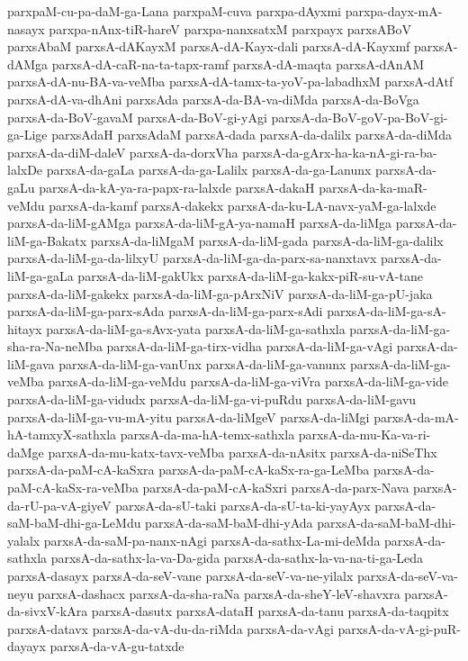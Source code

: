 {parxpaM-cu-pa-daM-ga-Lana
parxpaM-cuva
parxpa-dAyxmi
parxpa-dayx-mA-nasayx
parxpa-nAnx-tiR-hareV
parxpa-nanxsatxM
parxpayx
parxsABoV
parxsAbaM
parxsA-dAKayxM
parxsA-dA-Kayx-dali
parxsA-dA-Kayxmf
parxsA-dAMga
parxsA-dA-caR-na-ta-tapx-ramf
parxsA-dA-maqta
parxsA-dAnAM
parxsA-dA-nu-BA-va-veMba
parxsA-dA-tamx-ta-yoV-pa-labadhxM
parxsA-dAtf
parxsA-dA-va-dhAni
parxsAda
parxsA-da-BA-va-diMda
parxsA-da-BoVga
parxsA-da-BoV-gavaM
parxsA-da-BoV-gi-yAgi
parxsA-da-BoV-goV-pa-BoV-gi-ga-Lige
parxsAdaH
parxsAdaM
parxsA-dada
parxsA-da-dalilx
parxsA-da-diMda
parxsA-da-diM-daleV
parxsA-da-dorxVha
parxsA-da-gArx-ha-ka-nA-gi-ra-ba-lalxDe
parxsA-da-gaLa
parxsA-da-ga-Lalilx
parxsA-da-ga-Lanunx
parxsA-da-gaLu
parxsA-da-kA-ya-ra-papx-ra-lalxde
parxsA-dakaH
parxsA-da-ka-maR-veMdu
parxsA-da-kamf
parxsA-dakekx
parxsA-da-ku-LA-navx-yaM-ga-lalxde
parxsA-da-liM-gAMga
parxsA-da-liM-gA-ya-namaH
parxsA-da-liMga
parxsA-da-liM-ga-Bakatx
parxsA-da-liMgaM
parxsA-da-liM-gada
parxsA-da-liM-ga-dalilx
parxsA-da-liM-ga-da-lilxyU
parxsA-da-liM-ga-da-parx-sa-nanxtavx
parxsA-da-liM-ga-gaLa
parxsA-da-liM-gakUkx
parxsA-da-liM-ga-kakx-piR-su-vA-tane
parxsA-da-liM-gakekx
parxsA-da-liM-ga-pArxNiV
parxsA-da-liM-ga-pU-jaka
parxsA-da-liM-ga-parx-sAda
parxsA-da-liM-ga-parx-sAdi
parxsA-da-liM-ga-sA-hitayx
parxsA-da-liM-ga-sAvx-yata
parxsA-da-liM-ga-sathxla
parxsA-da-liM-ga-sha-ra-Na-neMba
parxsA-da-liM-ga-tirx-vidha
parxsA-da-liM-ga-vAgi
parxsA-da-liM-gava
parxsA-da-liM-ga-vanUnx
parxsA-da-liM-ga-vanunx
parxsA-da-liM-ga-veMba
parxsA-da-liM-ga-veMdu
parxsA-da-liM-ga-viVra
parxsA-da-liM-ga-vide
parxsA-da-liM-ga-vidudx
parxsA-da-liM-ga-vi-puRdu
parxsA-da-liM-gavu
parxsA-da-liM-ga-vu-mA-yitu
parxsA-da-liMgeV
parxsA-da-liMgi
parxsA-da-mA-hA-tamxyX-sathxla
parxsA-da-ma-hA-temx-sathxla
parxsA-da-mu-Ka-va-ri-daMge
parxsA-da-mu-katx-tavx-veMba
parxsA-da-nAsitx
parxsA-da-niSeThx
parxsA-da-paM-cA-kaSxra
parxsA-da-paM-cA-kaSx-ra-ga-LeMba
parxsA-da-paM-cA-kaSx-ra-veMba
parxsA-da-paM-cA-kaSxri
parxsA-da-parx-Nava
parxsA-da-rU-pa-vA-giyeV
parxsA-da-sU-taki
parxsA-da-sU-ta-ki-yayAyx
parxsA-da-saM-baM-dhi-ga-LeMdu
parxsA-da-saM-baM-dhi-yAda
parxsA-da-saM-baM-dhi-yalalx
parxsA-da-saM-pa-nanx-nAgi
parxsA-da-sathx-La-mi-deMda
parxsA-da-sathxla
parxsA-da-sathx-la-va-Da-gida
parxsA-da-sathx-la-va-na-ti-ga-Leda
parxsA-dasayx
parxsA-da-seV-vane
parxsA-da-seV-va-ne-yilalx
parxsA-da-seV-va-neyu
parxsA-dashacx
parxsA-da-sha-raNa
parxsA-da-sheY-leV-shavxra
parxsA-da-sivxV-kAra
parxsA-dasutx
parxsA-dataH
parxsA-da-tanu
parxsA-da-taqpitx
parxsA-datavx
parxsA-da-vA-du-da-riMda
parxsA-da-vAgi
parxsA-da-vA-gi-puR-dayayx
parxsA-da-vA-gu-tatxde
}
